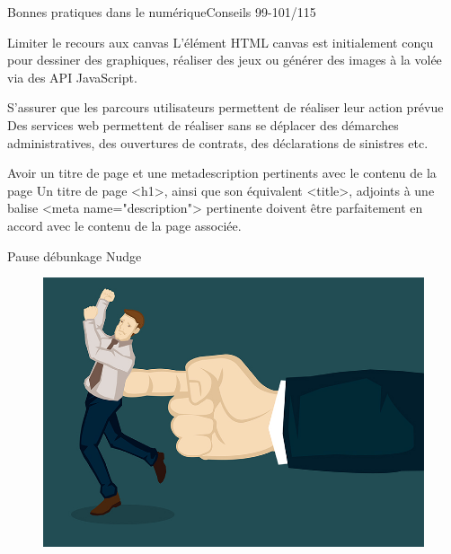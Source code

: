 \begin{frame}{Bonnes pratiques dans le numérique}{Conseils 99-101/115}
\begin{block}{Limiter le recours aux canvas}
L'élément HTML canvas est initialement conçu pour dessiner des graphiques, réaliser des jeux ou générer des images à la volée via des API JavaScript.
\end{block}

\begin{block}{S'assurer que les parcours utilisateurs permettent de réaliser leur action prévue}
Des services web permettent de réaliser sans se déplacer des démarches administratives, des ouvertures de contrats, des déclarations de sinistres etc.
\end{block}

\begin{block}{Avoir un titre de page et une metadescription pertinents avec le contenu de la page}
Un titre de page <h1>, ainsi que son équivalent <title>, adjoints à une balise <meta name="description"> pertinente doivent être parfaitement en accord avec le contenu de la page associée. 
\end{block}

\end{frame}


\begin{frame}{Pause débunkage }{Nudge}
\begin{figure}
    \centering
    \includegraphics[scale=1]{chapitre2/wdd8/fig/Nudge.jpg}
\end{figure}
\end{frame}